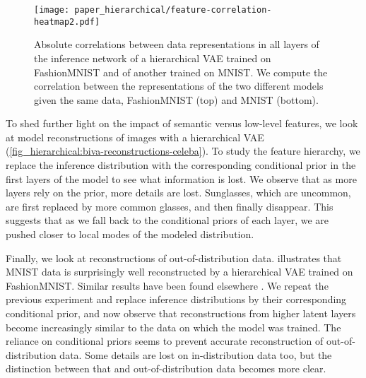 {\begin{figure}
    \centering
    \texttt{[image: paper\_hierarchical/feature-correlation-heatmap2.pdf]}
    \vspace{0mm}
    \caption[Absolute correlations between data representations in all layers of the inference network of a hierarchical VAE trained on FashionMNIST and of another trained on MNIST.]{
    Absolute correlations between data representations in all layers of the inference network of a hierarchical VAE trained on FashionMNIST and of another trained on MNIST.
    We compute the correlation between the representations of the two different models given the same data, FashionMNIST (top) and MNIST (bottom).
    }
    \vspace{0mm}
    \label{fig_hierarchical:correlations-heatmap}
\end{figure}

To shed further light on the impact of semantic versus low-level features, we look at model reconstructions of images with a hierarchical VAE (\cref{fig_hierarchical:biva-reconstructions-celeba}).
To study the feature hierarchy, we replace the inference distribution with the corresponding conditional prior in the first layers of the model to see what information is lost.
We observe that as more layers rely on the prior, more details are lost.
Sunglasses, which are uncommon, are first replaced by more common glasses, and then finally disappear.
This suggests that as we fall back to the conditional priors of each layer, we are pushed closer to local modes of the modeled distribution.

Finally, we look at reconstructions of out-of-distribution data.
 illustrates that MNIST data is surprisingly well reconstructed by a hierarchical VAE trained on FashionMNIST.
Similar results have been found elsewhere \parencite{xiao_likelihood_2020}.
We repeat the previous experiment and replace inference distributions by their corresponding conditional prior, and now observe that reconstructions from higher latent layers become increasingly similar to the data on which the model was trained.
The reliance on conditional priors seems to prevent accurate reconstruction of out-of-distribution data.
Some details are lost on in-distribution data too, but the distinction between that and out-of-distribution data becomes more clear.

}
